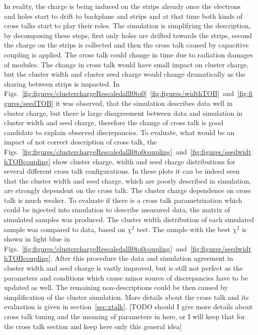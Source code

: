 In reality, the charge is being induced on the strips already once the electrons and holes start to drift to backplane and strips and at that time both kinds of cross talks start to play their roles. The simulation is simplifying the description, by decomposing these steps, first only holes are drifted towards the strips, second the charge on the strips is collected and then the cross talk caused by capacitive coupling is applied. The cross talk could change in time due to radiation damages of modules. The change in cross talk would have small impact on cluster charge, but the cluster width and cluster seed charge would change dramatically as the sharing between strips is impacted. In Figs.~\ref{fig:figures/clusterchargeRescaledalll0to0}~\ref{fig:figures/widthTOB}~and~\ref{fig:figures/seedTOB} it was observed, that the simulation describes data well in cluster charge, but there is large disagreement between data and simulation in cluster width and seed charge, therefore the change of cross talk is good candidate to explain observed discrepancies.  To evaluate, what would be an impact of not correct description of cross talk, the Figs.~\ref{fig:figures/clusterchargeRescaledalll0to0coupling}~and~\ref{fig:figures/seedwidthTOBcoupling} show cluster charge, width and seed charge distributions for several different cross talk configurations. In these plots it can be indeed seen that the cluster width and seed charge, which are poorly described in simulation, are strongly dependent on the cross talk. The cluster charge dependence on cross talk is much weaker. To evaluate if there is a cross talk parametrization which could be injected into simulation to describe measured data, the matrix of simulated samples was produced. The cluster width distribution of each simulated sample was compared to data, based on $\chi^{2}$ test. The sample with the best $\chi^{2}$ is shown in light blue in Figs.~\ref{fig:figures/clusterchargeRescaledalll0to0coupling}~and~\ref{fig:figures/seedwidthTOBcoupling}. After this procedure the data and simulation agreement in cluster width and seed charge is vastly improved, but is still not perfect as the parameters and conditions which cause minor source of discrepancies have to be updated as well. The remaining non-descriptions could be then caused by simplification of the cluster simulation. More details about the cross talk and its evaluation is given in section~\ref{sec:xtalk}. [TODO should I give more details about cross talk tuning and the meaning of parameters in here, or I will keep that for the cross talk section and keep here only this general idea]


